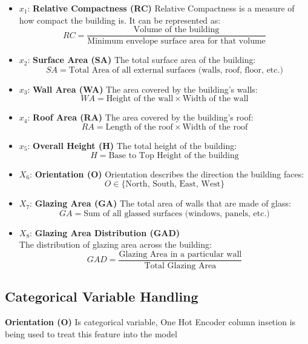 \documentclass{article}
\begin{document}
\begin{itemize}
    \item \( x_1 \): \textbf{Relative Compactness (RC)} Relative Compactness is a measure of how compact the building is. It can be represented as:
    \[
    RC = \frac{\text{Volume of the building}}{\text{Minimum envelope surface area for that volume}}
    \]

    \item \( x_2 \): \textbf{Surface Area (SA)} The total surface area of the building:
    \[
    SA = \text{Total Area of all external surfaces (walls, roof, floor, etc.)}
    \]

    \item \( x_3 \): \textbf{Wall Area (WA)} The area covered by the building's walls:
    \[
    WA = \text{Height of the wall} \times \text{Width of the wall}
    \]

    \item \( x_4 \): \textbf{Roof Area (RA)} The area covered by the building's roof:
    \[
    RA = \text{Length of the roof} \times \text{Width of the roof}
    \]

    \item \( x_5 \): \textbf{Overall Height (H)} The total height of the building:
    \[
    H = \text{Base to Top Height of the building}
    \]

    \item \( X_6 \): \textbf{Orientation (O)} Orientation describes the direction the building faces:
    \[
    O \in \{\text{North, South, East, West}\}
    \]

    \item \( X_7 \): \textbf{Glazing Area (GA)} The total area of walls that are made of glass:
    \[
    GA = \text{Sum of all glassed surfaces (windows, panels, etc.)}
    \]

    \item \( X_8 \): \textbf{Glazing Area Distribution (GAD)}\\
    The distribution of glazing area across the building:
    \[
    GAD = \frac{\text{Glazing Area in a particular wall}}{\text{Total Glazing Area}}
    \]
   
\end{itemize}
\subsection{Categorical Variable Handling}
\textbf{Orientation (O)} Is categorical variable, One Hot Encoder column insetion
is being used to treat this feature into the model
\end{document}
